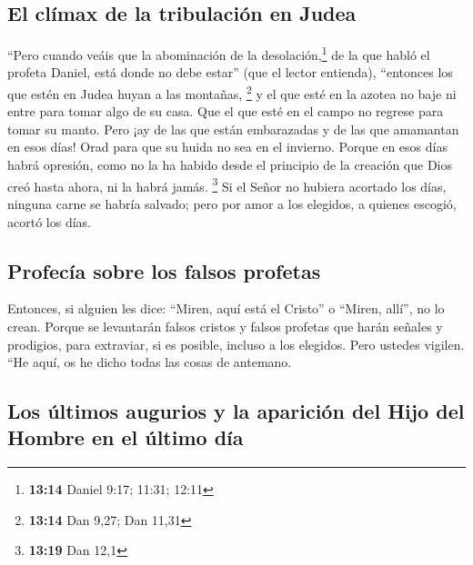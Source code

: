 \hypertarget{el-cluxedmax-de-la-tribulaciuxf3n-en-judea}{%
\subsection{El clímax de la tribulación en
Judea}\label{el-cluxedmax-de-la-tribulaciuxf3n-en-judea}}

 ``Pero cuando veáis que la abominación de la
desolación,\footnote{\textbf{13:14} Daniel 9:17; 11:31; 12:11} de la que
habló el profeta Daniel, está donde no debe estar'' (que el lector
entienda), ``entonces los que estén en Judea huyan a las montañas,
\footnote{\textbf{13:14} Dan 9,27; Dan 11,31}  y el que
esté en la azotea no baje ni entre para tomar algo de su casa.
 Que el que esté en el campo no regrese para tomar su
manto.  Pero ¡ay de las que están embarazadas y de las
que amamantan en esos días!  Orad para que su huida no
sea en el invierno.  Porque en esos días habrá opresión,
como no la ha habido desde el principio de la creación que Dios creó
hasta ahora, ni la habrá jamás. \footnote{\textbf{13:19} Dan 12,1}
 Si el Señor no hubiera acortado los días, ninguna carne
se habría salvado; pero por amor a los elegidos, a quienes escogió,
acortó los días.

\hypertarget{profecuxeda-sobre-los-falsos-profetas}{%
\subsection{Profecía sobre los falsos
profetas}\label{profecuxeda-sobre-los-falsos-profetas}}

 Entonces, si alguien les dice: ``Miren, aquí está el
Cristo'' o ``Miren, allí'', no lo crean.  Porque se
levantarán falsos cristos y falsos profetas que harán señales y
prodigios, para extraviar, si es posible, incluso a los elegidos.
 Pero ustedes vigilen. ``He aquí, os he dicho todas las
cosas de antemano.

\hypertarget{los-uxfaltimos-augurios-y-la-apariciuxf3n-del-hijo-del-hombre-en-el-uxfaltimo-duxeda}{%
\subsection{Los últimos augurios y la aparición del Hijo del Hombre en
el último
día}\label{los-uxfaltimos-augurios-y-la-apariciuxf3n-del-hijo-del-hombre-en-el-uxfaltimo-duxeda}}

